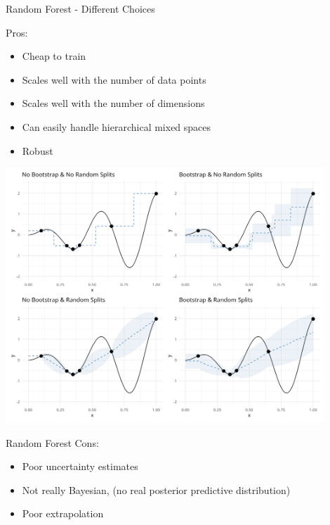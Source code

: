 \documentclass[11pt,compress,t,notes=noshow, xcolor=table]{beamer}
\begin{document}
\begin{vbframe}{Random Forest - Different Choices}

Pros:
\begin{itemize}
 \item Cheap to train
 \item Scales well with the number of data points
 \item Scales well with the number of dimensions
 \item Can easily handle hierarchical mixed spaces
 \item Robust
\end{itemize}

\framebreak

\begin{center}
  \includegraphics[width = 0.9\textwidth]{figure_man/surrogate_2.png}\\
\end{center}

\end{vbframe}


\begin{frame}{Random Forest}
Cons:
\begin{itemize}
  \item Poor uncertainty estimates
  \item Not really Bayesian, (no real posterior predictive distribution)
  \item Poor extrapolation
\end{itemize}
 
\end{frame}

\endlecture
\end{document}
